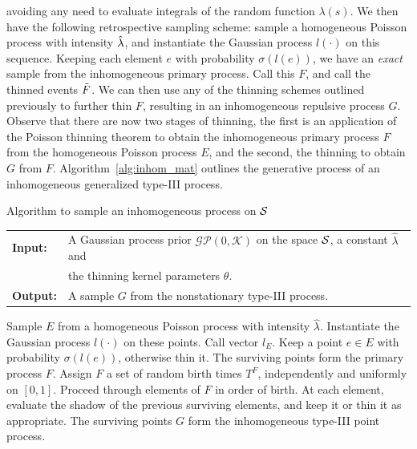 \documentclass{statsoc}
\begin{document}
avoiding any need to evaluate integrals of the random function $\lambda(s)$. We then have the
following retrospective sampling scheme: sample a homogeneous Poisson process with intensity $\hat{\lambda}$, and instantiate the Gaussian process $l(\cdot)$ on this sequence.
Keeping each element $e$ with probability ${\sigma(l(e))}$, 
we have an \emph{exact} sample from the inhomogeneous primary process. Call this $F$, and call the thinned events $\tilde{F}$. 
We can then use any of the \matern thinning schemes outlined previously to further thin $F$, resulting in an inhomogeneous repulsive process $G$.
Observe that there are now two stages of thinning, the first is an application of the 
Poisson thinning theorem to obtain the inhomogeneous primary process $F$ from the homogeneous Poisson process $E$, and the second, the \matern 
thinning to obtain $G$ from $F$. Algorithm~\ref{alg:inhom_mat} outlines the generative process of an inhomogeneous generalized \matern type-III process.
\begin{algorithm}
{Algorithm to sample an inhomogeneous \matern process on ${\mathcal S}$} \label{alg:inhom_mat}
\begin{tabular}{p{1.4cm}p{12.2cm}}
\textbf{Input:}  & A Gaussian process prior $\mathcal{GP}(0, \mathcal{K})$ on the space ${\mathcal S}$, a constant $\hat{\lambda}$ and \\
                 & the thinning kernel parameters $\theta$. \\
\textbf{Output:} & A sample $G$ from the nonstationary \matern type-III process. \\
\hline 
\end{tabular}
\begin{algorithmic}[1]
\State Sample $E$ from a homogeneous Poisson process with intensity $\hat{\lambda}$.
\State Instantiate the Gaussian process $l(\cdot)$ on these points. Call vector $l_E$.
\State %
       Keep a point $e \in E$ with probability $\sigma(l(e))$, otherwise thin it. The surviving points form the primary process $F$.
\State Assign $F$ a set of random birth times $T^F$, independently and uniformly on $[0,1]$.
\State Proceed through elements of $F$ in order of birth. At each element, evaluate the shadow of the previous surviving elements,
       and keep it or thin it as appropriate.
\State The surviving points $G$ form the inhomogeneous \matern type-III point process.
\end{algorithmic}
\end{algorithm}
\end{document}
